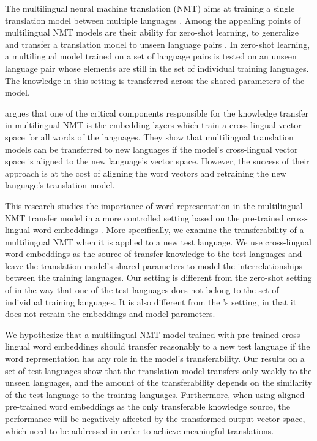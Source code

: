 \documentclass[thesis,fonts=libertine]{cluu}
\begin{document}
The multilingual neural machine translation (NMT) aims at training a single translation model between multiple languages \parencite{Johnson:2016aa,aharoni-etal-2019-massively}. Among the appealing points of multilingual NMT models are their ability for zero-shot learning, to generalize and transfer a translation model to unseen language pairs \parencite{Johnson:2016aa}. In zero-shot learning, a multilingual model trained on a set of language pairs is tested on an unseen language pair whose elements are still in the set of individual training languages. The knowledge in this setting is transferred across the shared parameters of the model. 

\cite{Kim:2019aa} argues that one of the critical components responsible for the knowledge transfer in multilingual NMT is the embedding layers which train a cross-lingual vector space for all words of the languages. They show that multilingual translation models can be transferred to new languages if the model's cross-lingual vector space is aligned to the new language's vector space. However, the success of their approach is at the cost of aligning the word vectors and retraining the new language's translation model.

This research studies the importance of word representation in the multilingual NMT transfer model in a more controlled setting based on the pre-trained cross-lingual word embeddings \parencite{Bojanowski:2016aa,Ammar:2016aa,Joulin:2018aa,Ruder:2019aa}. More specifically, we examine the transferability of a multilingual NMT when it is applied to a new test language.  We use cross-lingual word embeddings as the source of transfer knowledge to the test languages and leave the translation model's shared parameters to model the interrelationships between the training languages. Our setting is different from the zero-shot setting of \cite{Johnson:2016aa} in the way that one of the test languages does not belong to the set of individual training languages. It is also different from the \cite{Kim:2019aa}'s setting, in that it does not retrain the embeddings and model parameters. 

We hypothesize that a multilingual NMT model trained with pre-trained cross-lingual word embeddings should transfer reasonably to a new test language if the word representation has any role in the model's transferability. Our results on a set of test languages show that the translation model transfers only weakly to the unseen languages, and the amount of the transferability depends on the similarity of the test language to the training languages. Furthermore, when using aligned pre-trained word embeddings as the only transferable knowledge source, the performance will be negatively affected by the transformed output vector space, which need to be addressed in order to achieve meaningful translations.
\end{document}
